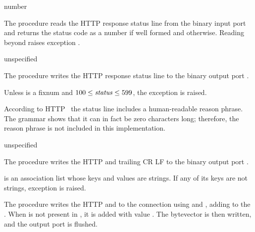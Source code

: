 \begin{procedure}
\end{procedure}
\returns{} number \alt{} 

The  procedure reads the HTTP response status
line from the binary input port  and returns the status code
as a number if well formed and  otherwise. Reading beyond
 raises exception .

\begin{procedure}
\end{procedure}
\returns{} unspecified

The  procedure writes the HTTP response
status line to the binary output port .

Unless  is a fixnum and $100 \leq \var{status} \leq 599$, the
exception  is
raised.

According to HTTP~\cite{RFC7230} the status line includes a
human-readable reason phrase. The grammar shows that it can in fact be
zero characters long; therefore, the reason phrase is not included in
this implementation.

\begin{procedure}
\end{procedure}
\returns{} unspecified

The  procedure writes the HTTP
 and trailing CR LF to the binary output port
.

 is an association list whose keys and values are
strings. If any of its keys are not strings, exception
 is raised.

\begin{procedure}
\end{procedure}
\returns{} 

The  procedure writes the HTTP  and
 to the connection  using
 and , adding
 to the . When
 is not present in , it is added
with value . The  bytevector is then
written, and the output port is flushed.


